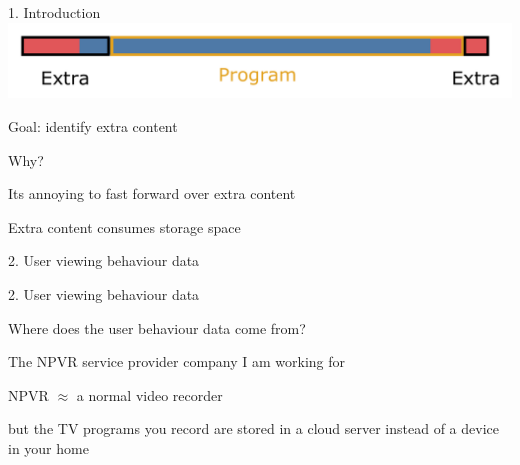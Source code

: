 \documentclass[first=orange,second=blue,logo=blueque]{aaltoslides}
\newcommand{\SubItem}[1]{
    {\setlength\itemindent{15pt} \item[$\bullet$] #1}
}
\begin{document}

\begin{frame}{1. Introduction}
    \includegraphics[width=1\textwidth]{figures/recording2.pdf}
    \begin{itemize}
        \item Goal: identify extra content
        \item Why?
            \SubItem{Its annoying to fast forward over extra content}
            \SubItem{Extra content consumes storage space}
    \end{itemize}
\end{frame}
        

\begin{frame}{2. User viewing behaviour data}
\end{frame}


\begin{frame}{2. User viewing behaviour data}
    \begin{block}{{\color{black}\alert{Where} does the user behaviour data come from?}}
        \begin{itemize}
            \item The NPVR service provider company I am working for
            \item NPVR $\approx$ a normal video recorder
                \SubItem{but the TV programs you record are stored in a cloud server instead of a device in your home}
        \end{itemize}
    \end{block}
\end{frame}
\end{document}
